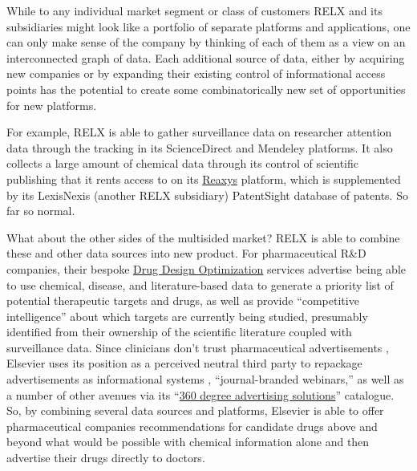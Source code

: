 While to any individual market segment or class of customers RELX and
its subsidiaries might look like a portfolio of separate platforms and
applications, one can only make sense of the company by thinking of each
of them as a view on an interconnected graph of data. Each additional source of data, either by acquiring new
companies or by expanding their existing control of informational access
points has the potential to create some combinatorically new set of
opportunities for new platforms.

For example, RELX is able to gather surveillance data on researcher
attention data through the tracking in its ScienceDirect and Mendeley
platforms. It also collects a large amount of chemical data through its
control of scientific publishing that it rents access to on its
\href{https://www.elsevier.com/en-gb/solutions/reaxys}{Reaxys} platform,
which is supplemented by its LexisNexis (another RELX subsidiary)
PatentSight database of patents. So far so normal.

What about the other sides of the multisided market? RELX is able to
combine these and other data sources into new product. For
pharmaceutical R\&D companies, their bespoke
\href{https://web.archive.org/web/20211207070524/https://www.elsevier.com/solutions/professional-services/drug-design-optimization}{Drug
Design Optimization} services advertise being able to use chemical,
disease, and literature-based data to generate a priority list of
potential therapeutic targets and drugs, as well as provide
``competitive intelligence'' about which targets are currently being
studied, presumably identified from their ownership of the scientific
literature coupled with surveillance data. Since clinicians don't trust
pharmaceutical advertisements \cite{elsevierMakingMedicalInformation2021} , Elsevier uses its position as
a perceived neutral third party to repackage advertisements as
informational systems \cite{elsevierRethinkClincalContent2020} ,
``journal-branded webinars,'' as well as a number of other avenues via
its
``\href{https://web.archive.org/web/20211111211058/https://www.elsevier.com/advertising-reprints-supplements/advertising}{360
degree advertising solutions}'' catalogue. So, by combining several data
sources and platforms, Elsevier is able to offer pharmaceutical
companies recommendations for candidate drugs above and beyond what
would be possible with chemical information alone and then advertise
their drugs directly to doctors.

